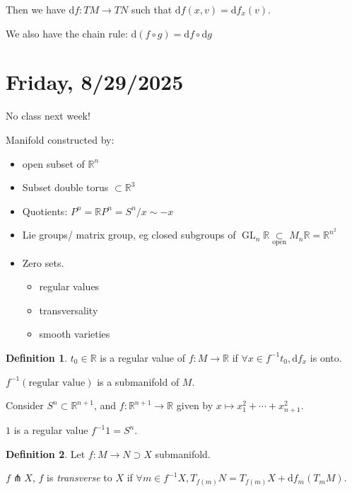 \documentclass{article}
\theoremstyle{definition}
\newtheorem*{definition}{Definition}
\begin{document}
    Then we have \(\mathrm{d} f: TM \to TN\) such that \(\mathrm{d} f(x,v) = \mathrm{d} f_x(v)\).

    We also have the chain rule: \(\mathrm{d} (f \circ g) = \mathrm{d} f \circ \mathrm{d} g\) 

    \section*{Friday, 8/29/2025}
    
    No class next week!

    Manifold constructed by:

    \begin{itemize}
        \item open subset of \(\mathbb{R}^n\)
        \item Subset double torus \(\subset \mathbb{R}^3\)
        \item Quotients: \(P^n = \mathbb{R} P^n = S^n / x \sim -x\)
        \item Lie groups/ matrix group, eg closed subgroups of \(\operatorname{GL}_n\mathbb{R} \underset{\text{open}}{\subset} M_n \mathbb{R} = \mathbb{R}^{n^2}\) 
        \item Zero sets.
        \begin{itemize}
            \item regular values
            \item transversality
            \item smooth varieties 
        \end{itemize} 
    \end{itemize} 

    \begin{definition}
        \(t_0\in \mathbb{R}\) is a regular value of \(f: M \to \mathbb{R}\) if \(\forall x\in f ^{-1} t_0, \mathrm{d}f_x\) is onto.
    \end{definition}

    \(f^{-1}(\text{regular value})\) is a submanifold of \(M\).

    Consider \(S^n \subset \mathbb{R}^{n+1}\), and \(f: \mathbb{R}^{n+1} \to \mathbb{R}\) given by \(x \mapsto x_1^2 + \cdots + x_{n+1}^2\).

    \(1\) is a regular value \(f ^{-1} 1 = S^n\).

    \begin{definition}
        Let \(f: M \to N \supset X\) submanifold.

        \(f\pitchfork X\), \(f\) is \textit{transverse} to \(X\) if \(\forall m \in f ^{-1} X, T_{f(m)}N = T_{f(m)} X + \mathrm{d}f_m (T_m M)\).
    \end{definition}
\end{document}
